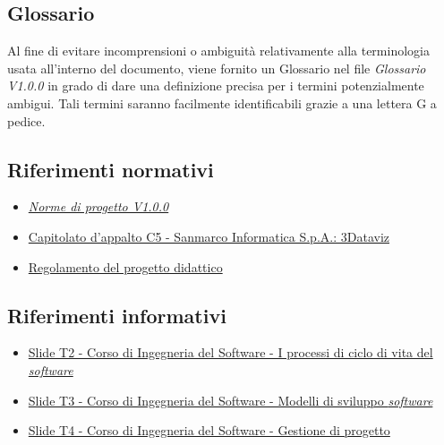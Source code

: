 \subsection{Glossario}
Al fine di evitare incomprensioni o ambiguità relativamente alla terminologia
usata all'interno del documento, viene fornito un Glossario nel file
\textit{Glossario V1.0.0} in grado di dare una definizione precisa per i
termini potenzialmente ambigui. Tali termini saranno facilmente identificabili
grazie a una lettera G a pedice.
\subsection{Riferimenti normativi}
\begin{itemize}
      \item \href{URL}{\textit{Norme di progetto V1.0.0}}
      \item \href{https://www.math.unipd.it/~tullio/IS-1/2024/Progetto/C5.pdf}
            {Capitolato d'appalto C5 - Sanmarco Informatica S.p.A.: 3Dataviz}
      \item \href{https://www.math.unipd.it/~tullio/IS-1/2024/Dispense/PD1.pdf}
            {Regolamento del progetto didattico}
\end{itemize}
\subsection{Riferimenti informativi}
\begin{itemize}
      \item \href{https://www.math.unipd.it/~tullio/IS-1/2024/Dispense/T02.pdf}
            {Slide T2 - Corso di Ingegneria del Software - I processi di ciclo di vita del \textit{software}}
      \item \href{https://www.math.unipd.it/~tullio/IS-1/2024/Dispense/T03.pdf}
            {Slide T3 - Corso di Ingegneria del Software - Modelli di sviluppo \textit{software}}
      \item \href{https://www.math.unipd.it/~tullio/IS-1/2024/Dispense/T04.pdf}
            {Slide T4 - Corso di Ingegneria del Software - Gestione di progetto}
\end{itemize}
